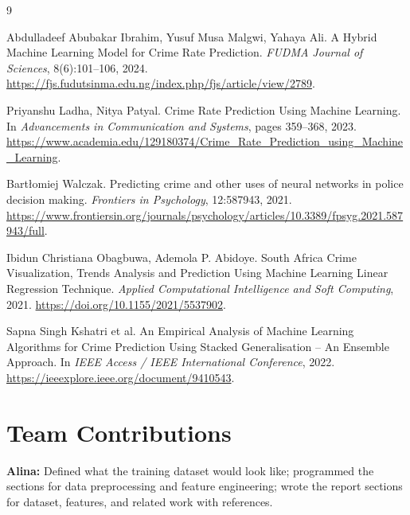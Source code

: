 \documentclass[11pt]{article}
\begin{document}
\begin{thebibliography}{9}

Abdulladeef Abubakar Ibrahim, Yusuf Musa Malgwi, Yahaya Ali.
\newblock A Hybrid Machine Learning Model for Crime Rate Prediction.
\newblock \emph{FUDMA Journal of Sciences}, 8(6):101--106, 2024.
\newblock \url{https://fjs.fudutsinma.edu.ng/index.php/fjs/article/view/2789}.

Priyanshu Ladha, Nitya Patyal.
\newblock Crime Rate Prediction Using Machine Learning.
\newblock In \emph{Advancements in Communication and Systems}, pages 359--368, 2023.
\newblock \url{https://www.academia.edu/129180374/Crime_Rate_Prediction_using_Machine_Learning}.

Bartłomiej Walczak.
\newblock Predicting crime and other uses of neural networks in police decision making.
\newblock \emph{Frontiers in Psychology}, 12:587943, 2021.
\newblock \url{https://www.frontiersin.org/journals/psychology/articles/10.3389/fpsyg.2021.587943/full}.

Ibidun Christiana Obagbuwa, Ademola P. Abidoye.
\newblock South Africa Crime Visualization, Trends Analysis and Prediction Using Machine Learning Linear Regression Technique.
\newblock \emph{Applied Computational Intelligence and Soft Computing}, 2021.
\newblock \url{https://doi.org/10.1155/2021/5537902}.

Sapna Singh Kshatri et al.
\newblock An Empirical Analysis of Machine Learning Algorithms for Crime Prediction Using Stacked Generalisation – An Ensemble Approach.
\newblock In \emph{IEEE Access / IEEE International Conference}, 2022.
\newblock \url{https://ieeexplore.ieee.org/document/9410543}.

\end{thebibliography}

\section*{Team Contributions}


\textbf{Alina:} Defined what the training dataset would look like; programmed the sections for data preprocessing and feature engineering; wrote the report sections for dataset, features, and related work with references.
\end{document}
